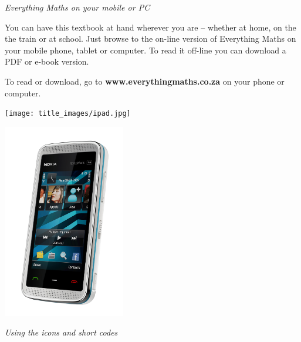 \newpage
\thispagestyle{empty}

{\normalfont\sffamily\fontsize{22}\normalfont\itshape Everything Maths on your mobile or PC} \par

{\Large
You can have this textbook at hand wherever you are – whether at home, on the the train or at school.
Just browse to the on-line version of Everything Maths on your mobile phone, tablet or computer. To
read it off-line you can download a PDF or e-book version.\par


To read or download, go to \textbf{www.everythingmaths.co.za} on your phone or computer.} \vspace*{2cm}


\begin{center}
\begin{minipage}{0.4\textwidth}
\centering
\texttt{[image: title\_images/ipad.jpg]}
\end{minipage}
\begin{minipage}{0.4\textwidth}
\centering
\includegraphics[width=0.4\textwidth]{title_images/phone.png}
\end{minipage}
\end{center}

\vspace*{2cm}


{\normalfont\sffamily\fontsize{22}\normalfont\itshape Using the icons and short codes} \par

